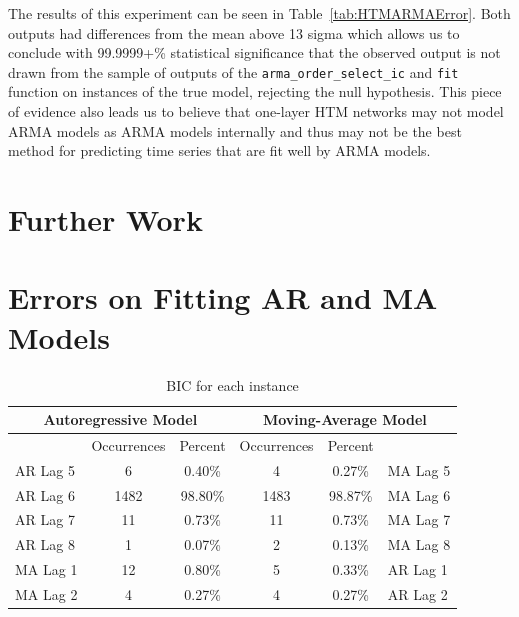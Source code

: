 \documentclass[oneside,12pt,openany]{book}
\begin{document}
	The results of this experiment can be seen in Table~\ref{tab:HTMARMAError}. Both outputs had differences from the mean above 13 sigma which allows us to conclude with 99.9999+\% statistical significance that the observed output is not drawn from the sample of outputs of the \texttt{arma\_order\_select\_ic} and \texttt{fit} function on instances of the true model, rejecting the null hypothesis. This piece of evidence also leads us to believe that one-layer HTM networks may not model ARMA models as ARMA models internally and thus may not be the best method for predicting time series that are fit well by ARMA models.

	
	
	\chapter{Further Work}
	
	
	
	\nocite{*}  %
	{}
	
	\appendices
		\chapter{Errors on Fitting AR and MA Models}\label{app:errors}
		
			\begin{table}[!ht]
			\centering
			\begin{tabular}{|l|c|c|c|c|l|}
				\hline
				\multicolumn{3}{|c|}{Autoregressive Model} & \multicolumn{3}{c|}{Moving-Average Model} \\ \hline
				\cellcolor{black} & Occurrences & Percent & Occurrences & Percent & \cellcolor{black} \\ \hline
				AR Lag 5 & 6 & 0.40\% & 4 & 0.27\% & MA Lag 5 \\ \hline
				AR Lag 6 & 1482 & 98.80\% & 1483 & 98.87\% & MA Lag 6 \\ \hline
				AR Lag 7 & 11 & 0.73\% & 11 & 0.73\% & MA Lag 7 \\ \hline
				AR Lag 8 & 1 & 0.07\% & 2 & 0.13\% & MA Lag 8 \\ \hline
				MA Lag 1 & 12 & 0.80\% & 5 & 0.33\% & AR Lag 1 \\ \hline
				MA Lag 2 & 4 & 0.27\% & 4 & 0.27\% & AR Lag 2 \\ \hline
			\end{tabular}
			\caption{BIC for each instance}
		\end{table}
		
\end{document}
